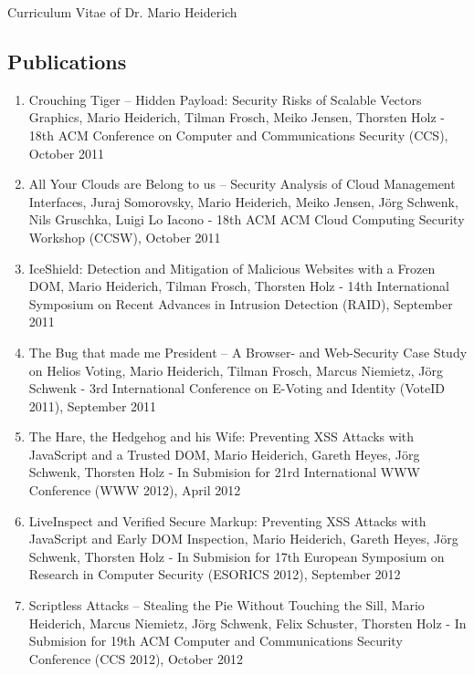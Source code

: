 \begin{cv}{Curriculum Vitae of Dr. Mario Heiderich}
\subsection*{Publications}
\begin{enumerate}
  \item Crouching Tiger -- Hidden Payload: Security Risks of Scalable Vectors Graphics, Mario Heiderich, Tilman Frosch, Meiko Jensen, Thorsten Holz - 18th ACM Conference on Computer and Communications Security (CCS), October 2011 
  \item All Your Clouds are Belong to us -- Security Analysis of Cloud Management Interfaces, Juraj Somorovsky, Mario Heiderich, Meiko Jensen, Jörg Schwenk, Nils Gruschka, Luigi Lo Iacono - 18th ACM ACM Cloud Computing Security Workshop (CCSW), October 2011 
  \item IceShield: Detection and Mitigation of Malicious Websites with a Frozen DOM, Mario Heiderich, Tilman Frosch, Thorsten Holz - 14th International Symposium on Recent Advances in Intrusion Detection (RAID), September 2011
  \item The Bug that made me President -- A Browser- and Web-Security Case Study on Helios Voting, Mario Heiderich, Tilman Frosch, Marcus Niemietz, Jörg Schwenk - 3rd International Conference on E-Voting and Identity (VoteID 2011), September 2011
  \item The Hare, the Hedgehog and his Wife: Preventing XSS Attacks with JavaScript and a Trusted DOM, Mario Heiderich, Gareth Heyes, Jörg Schwenk, Thorsten Holz - In Submision for 21rd International WWW Conference (WWW 2012), April 2012
  \item LiveInspect and Verified Secure Markup: Preventing XSS Attacks with JavaScript and Early DOM Inspection, Mario Heiderich, Gareth Heyes, Jörg Schwenk, Thorsten Holz - In Submision for 17th European Symposium on Research in Computer Security (ESORICS 2012), September 2012  
  \item Scriptless Attacks -- Stealing the Pie Without Touching the Sill, Mario Heiderich, Marcus Niemietz, Jörg Schwenk, Felix Schuster, Thorsten Holz - In Submision for 19th ACM Computer and Communications Security Conference (CCS 2012), October 2012    
\end{enumerate}


\end{cv}
